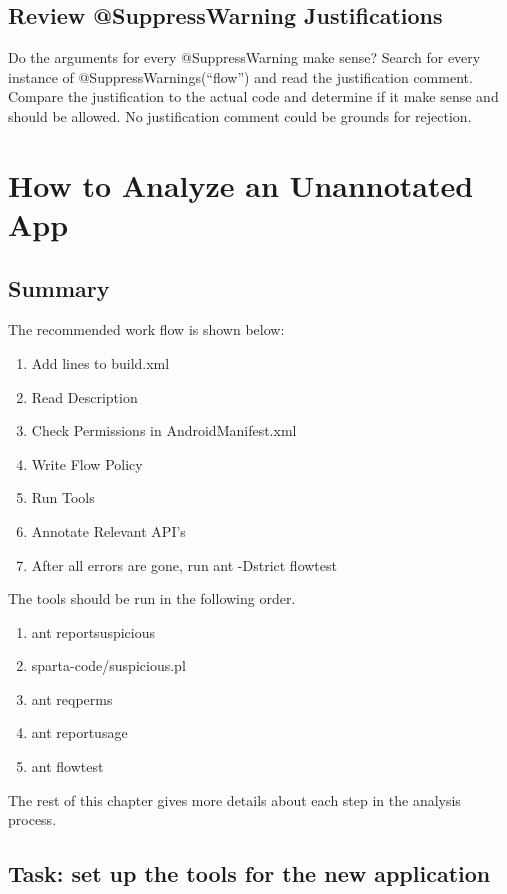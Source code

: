 \subsection{Review @SuppressWarning Justifications}
 Do the arguments for every @SuppressWarning make sense? Search for every instance of 
 @SuppressWarnings(``flow'') and read the justification comment.  Compare the justification to the
  actual code and determine if it make sense and should be allowed.  No justification comment 
  could be grounds for rejection.
  
\section{How to Analyze an Unannotated App}

\subsection{Summary}

The recommended work flow is shown below:  

\begin{enumerate}
\item Add lines to build.xml
\item Read Description
\item Check Permissions in AndroidManifest.xml
\item Write Flow Policy
\item Run Tools
\item Annotate Relevant API's
\item After all errors are gone, run ant -Dstrict flowtest
\end{enumerate}

\noindent 
The tools should be run in the following order. 

\begin{enumerate}
\item ant reportsuspicious 
\item sparta-code/suspicious.pl
\item ant reqperms
\item ant reportusage
\item ant flowtest
\end{enumerate}

\noindent 
The rest of this chapter gives more details about each step in the analysis process.


\subsection{Task:  set up the tools for the new application}
\label{subsec:setupapp}

